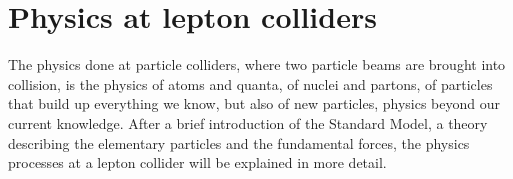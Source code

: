 \chapter{Physics at lepton colliders}
\label{Lepton_Physics}
\begin{chapterabstract}
The physics done at particle colliders, where two particle beams are brought into collision, is the physics of atoms and quanta, of nuclei and partons, of particles that build up everything we know, but also of new particles, physics beyond our current knowledge.
After a brief introduction of the Standard Model, a theory describing the elementary particles and the fundamental forces, the physics processes at a lepton collider will be explained in more detail.
\end{chapterabstract}
\newline

